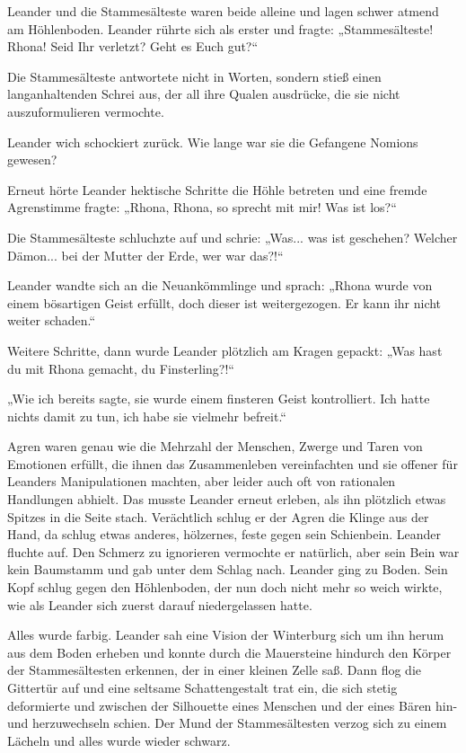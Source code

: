 Leander und die Stammesälteste waren beide alleine und lagen schwer atmend am Höhlenboden. Leander rührte sich als erster und fragte: „Stammesälteste! Rhona! Seid Ihr verletzt? Geht es Euch gut?“

Die Stammesälteste antwortete nicht in Worten, sondern stieß einen langanhaltenden Schrei aus, der all ihre Qualen ausdrücke, die sie nicht auszuformulieren vermochte.

Leander wich schockiert zurück. Wie lange war sie die Gefangene Nomions gewesen?

Erneut hörte Leander hektische Schritte die Höhle betreten und eine fremde Agrenstimme fragte: „Rhona, Rhona, so sprecht mit mir! Was ist los?“

Die Stammesälteste schluchzte auf und schrie: „Was... was ist geschehen? Welcher Dämon... bei der Mutter der Erde, wer war das?!“

Leander wandte sich an die Neuankömmlinge und sprach: „Rhona wurde von einem bösartigen Geist erfüllt, doch dieser ist weitergezogen. Er kann ihr nicht weiter schaden.“

Weitere Schritte, dann wurde Leander plötzlich am Kragen gepackt: „Was hast du mit Rhona gemacht, du Finsterling?!“

„Wie ich bereits sagte, sie wurde einem finsteren Geist kontrolliert. Ich hatte nichts damit zu tun, ich habe sie vielmehr befreit.“

Agren waren genau wie die Mehrzahl der Menschen, Zwerge und Taren von Emotionen erfüllt, die ihnen das Zusammenleben vereinfachten und sie offener für Leanders Manipulationen machten, aber leider auch oft von rationalen Handlungen abhielt. Das musste Leander erneut erleben, als ihn plötzlich etwas Spitzes in die Seite stach. Verächtlich schlug er der Agren die Klinge aus der Hand, da schlug etwas anderes, hölzernes, feste gegen sein Schienbein. Leander fluchte auf. Den Schmerz zu ignorieren vermochte er natürlich, aber sein Bein war kein Baumstamm und gab unter dem Schlag nach. Leander ging zu Boden. Sein Kopf schlug gegen den Höhlenboden, der nun doch nicht mehr so weich wirkte, wie als Leander sich zuerst darauf niedergelassen hatte.

Alles wurde farbig. Leander sah eine Vision der Winterburg sich um ihn herum aus dem Boden erheben und konnte durch die Mauersteine hindurch den Körper der Stammesältesten erkennen, der in einer kleinen Zelle saß. Dann flog die Gittertür auf und eine seltsame Schattengestalt trat ein, die sich stetig deformierte und zwischen der Silhouette eines Menschen und der eines Bären hin- und herzuwechseln schien. Der Mund der Stammesältesten verzog sich zu einem Lächeln und alles wurde wieder schwarz.

